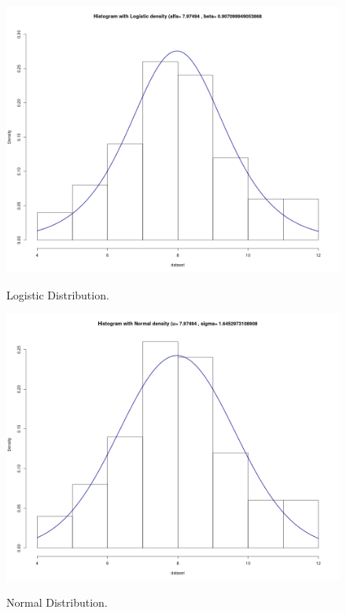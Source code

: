 \documentclass[12pt]{article}
\begin{document}
\begin{figure}[h]
\begin{minipage}[b]{0.5\linewidth}
		\label{histogram_gamma}
	\end{minipage} 
	\begin{minipage}[b]{0.5\linewidth}
		\centering
		\includegraphics[width=\linewidth]{images/Histogram_Logistic.png} 
		\caption{Logistic Distribution.}
		\vspace{4ex}
		\label{histogram_logistic}
	\end{minipage}%
	\begin{minipage}[b]{0.5\linewidth}
		\centering
		\includegraphics[width=\linewidth]{images/Histogram_Normal.png} 
		\caption{Normal Distribution.}
		\vspace{4ex}
		\label{histogram_normal}
	\end{minipage} 
\end{figure}
\end{document}
